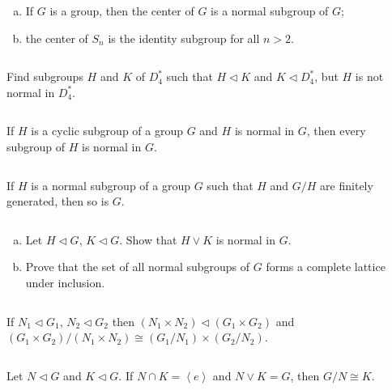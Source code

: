 $$ $$

\begin{ex}
    \begin{enumerate}[(a)]
        \item If $G$ is a group, then the center of $G$ is a normal subgroup of $G$;
        \item the center of $S_{n}$ is the identity subgroup for all $n>2$.
    \end{enumerate}
\end{ex}

$$ $$

\begin{ex}
    Find subgroups $H$ and $K$ of $D_{4}^{*}$ such that $H\lhd K$ and $K\lhd D_{4}^{*}$, but $H$ is not normal in $D_{4}^{*}$.
\end{ex}

$$ $$

\begin{ex}
    If $H$ is a cyclic subgroup of a group $G$ and $H$ is normal in $G$, then every subgroup of $H$ is normal in $G$.
\end{ex}

$$ $$

\begin{ex}
    If $H$ is a normal subgroup of a group $G$ such that $H$ and $G/H$ are finitely generated, then so is $G$.
\end{ex}

$$ $$

\begin{ex}
    \begin{enumerate}[(a)]
        \item Let $H\lhd G$, $K\lhd G$. Show that $H\vee K$ is normal in $G$.
        \item Prove that the set of all normal subgroups of $G$ forms a complete lattice under inclusion.
    \end{enumerate}
\end{ex}

$$ $$

\begin{ex}
    If $N_{1}\lhd G_{1}$, $N_{2}\lhd G_{2}$ then $(N_{1}\times N_{2})\lhd (G_{1}\times G_{2})$ and $(G_{1}\times G_{2})/(N_{1}\times N_{2})\cong (G_{1}/N_{1})\times(G_{2}/N_{2})$.
\end{ex}

$$ $$

\begin{ex}
    Let $N\lhd G$ and $K\lhd G$. If $N\cap K=\left\langle e\right\rangle$ and $N\vee K=G$, then $G/N\cong K$.
\end{ex}

